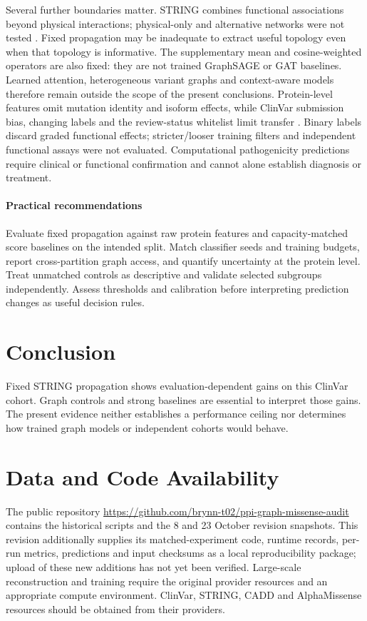 \documentclass[conference]{IEEEtran}
\begin{document}
Several further boundaries matter. STRING combines functional associations beyond physical interactions; physical-only and alternative networks were not tested \cite{Szklarczyk2023STRING}. Fixed propagation may be inadequate to extract useful topology even when that topology is informative. The supplementary mean and cosine-weighted operators are also fixed: they are not trained GraphSAGE or GAT baselines. Learned attention, heterogeneous variant graphs and context-aware models therefore remain outside the scope of the present conclusions. Protein-level features omit mutation identity and isoform effects, while ClinVar submission bias, changing labels and the review-status whitelist limit transfer \cite{Landrum2020ClinVar}. Binary labels discard graded functional effects; stricter/looser training filters and independent functional assays were not evaluated. Computational pathogenicity predictions require clinical or functional confirmation and cannot alone establish diagnosis or treatment.

\paragraph{Practical recommendations}
Evaluate fixed propagation against raw protein features and capacity-matched score baselines on the intended split. Match classifier seeds and training budgets, report cross-partition graph access, and quantify uncertainty at the protein level. Treat unmatched controls as descriptive and validate selected subgroups independently. Assess thresholds and calibration before interpreting prediction changes as useful decision rules.

\section{Conclusion}
Fixed STRING propagation shows evaluation-dependent gains on this ClinVar cohort. Graph controls and strong baselines are essential to interpret those gains. The present evidence neither establishes a performance ceiling nor determines how trained graph models or independent cohorts would behave.

\section*{Data and Code Availability}

The public repository \url{https://github.com/brynn-t02/ppi-graph-missense-audit} contains the historical scripts and the 8 and 23 October revision snapshots. This revision additionally supplies its matched-experiment code, runtime records, per-run metrics, predictions and input checksums as a local reproducibility package; upload of these new additions has not yet been verified. Large-scale reconstruction and training require the original provider resources and an appropriate compute environment. ClinVar, STRING, CADD and AlphaMissense resources should be obtained from their providers.
\end{document}

